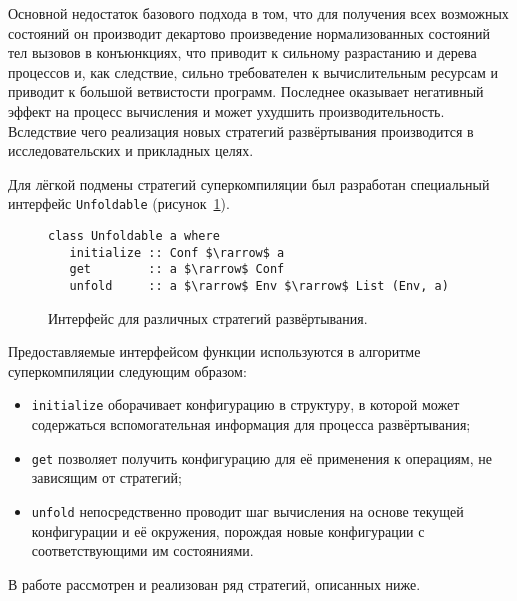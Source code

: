 Основной недостаток базового подхода в том, что для получения всех возможных
состояний он производит декартово произведение нормализованных состояний тел
вызовов в конъюнкциях, что приводит к сильному разрастанию и дерева процессов и,
как следствие, сильно требователен к вычислительным ресурсам и приводит
к большой ветвистости программ. Последнее оказывает негативный эффект на процесс
вычисления и может ухудшить производительность.
Вследствие чего реализация новых стратегий развёртывания производится
в исследовательских и прикладных целях.

Для лёгкой подмены стратегий суперкомпиляции был разработан специальный интерфейс \lstinline{Unfoldable}
(рисунок~\ref{fig:unfoldable}).
\begin{figure}[h!]
\begin{lstlisting}
class Unfoldable a where
   initialize :: Conf $\rarrow$ a
   get        :: a $\rarrow$ Conf
   unfold     :: a $\rarrow$ Env $\rarrow$ List (Env, a)
\end{lstlisting}
\caption{Интерфейс для различных стратегий развёртывания.}
\label{fig:unfoldable}
\end{figure}

Предоставляемые интерфейсом функции используются в алгоритме суперкомпиляции следующим образом:
\begin{itemize}
\item \lstinline{initialize} оборачивает конфигурацию в структуру, в которой может содержаться
      вспомогательная информация для процесса развёртывания;
\item \lstinline{get} позволяет получить конфигурацию для её применения к операциям, не зависящим
      от стратегий;
\item \lstinline{unfold} непосредственно проводит шаг вычисления на основе текущей конфигурации
      и её окружения, порождая новые конфигурации с соответствующими им состояниями.
\end{itemize}

В работе рассмотрен и реализован ряд стратегий, описанных ниже.

